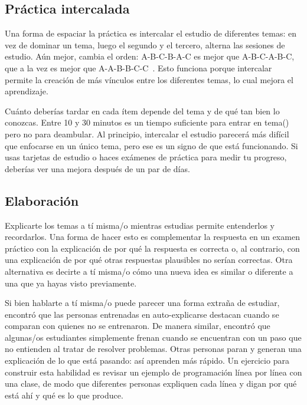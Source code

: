 \subsection*{Práctica intercalada}

Una forma de espaciar la práctica es intercalar el estudio de diferentes temas:
en vez de dominar un tema,
luego el segundo y el tercero,
alterna las sesiones de estudio.
Aún mejor,
cambia el orden:
A-B-C-B-A-C es mejor que A-B-C-A-B-C,
que a la vez es mejor que A-A-B-B-C-C~\cite{Rohr2015}.
Esto funciona porque intercalar permite la creación de más vínculos entre los diferentes temas,
lo cual mejora el aprendizaje.

Cuánto deberías tardar en cada ítem
depende del tema y de qué tan bien lo conozcas.
Entre 10 y 30 minutos es un tiempo suficiente para
entrar en tema()
pero no para deambular.
Al principio, intercalar el estudio parecerá más difícil que enfocarse en un único tema,
pero ese es un signo de que está funcionando.
Si usas tarjetas de estudio o haces exámenes de práctica para medir tu progreso,
deberías ver una mejora después de un par de días.

\subsection*{Elaboración}

Explicarte los temas a tí misma/o mientras estudias
permite entenderlos y recordarlos.
Una forma de hacer esto es complementar la respuesta en un examen práctico
con la explicación de por qué la respuesta es correcta
o, al contrario, con una explicación de por qué otras respuestas plausibles no serían correctas.
Otra alternativa es decirte a tí misma/o
cómo una nueva idea es similar o diferente a una que ya hayas visto previamente.

Si bien hablarte a tí misma/o puede parecer una forma extraña de estudiar,
~\cite{Biel1995} encontró que
las personas entrenadas en auto-explicarse destacan cuando se comparan con quienes no se entrenaron.
De manera similar,
\cite{Chi1989} encontró que algunas/os estudiantes simplemente frenan cuando se encuentran con un paso que no entienden
al tratar de resolver problemas.
Otras personas paran y generan una explicación de lo que está pasando:
así aprenden más rápido.
Un ejercicio para construir esta habilidad es revisar un ejemplo de programación línea por línea con una clase, de modo 
que diferentes personas expliquen cada línea
y digan por qué está ahí y qué es lo que produce.

